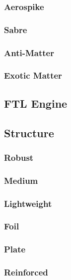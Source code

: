 \subsubsection{Aerospike}

\subsubsection{Sabre}

\subsubsection{Anti-Matter}

\subsubsection{Exotic Matter}

\subsection{FTL Engine}

\subsection{Structure}

\subsubsection{Robust}

\subsubsection{Medium}

\subsubsection{Lightweight}

\subsubsection{Foil}

\subsubsection{Plate}

\subsubsection{Reinforced}

